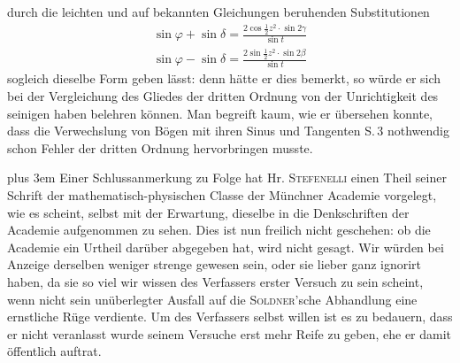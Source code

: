 durch die leichten und auf bekannten Gleichungen beruhenden Substitutionen
\[
\begin{gathered}
\sin\varphi+\sin\delta=\frac{2\cos\frac{1}{2}z^2\cdot\sin2\gamma}{\sin t}\\[5pt]
\sin\varphi-\sin\delta=\frac{2\sin\frac{1}{2}z^2\cdot\sin2\beta}{\sin t}
\end{gathered}
\]
sogleich dieselbe Form geben lässt: denn hätte er dies bemerkt, so würde er sich bei der
Vergleichung des Gliedes der dritten Ordnung von der Unrichtigkeit des seinigen haben belehren
können. Man begreift kaum, wie er übersehen konnte, dass die Verwechslung von Bögen mit ihren
Sinus und Tangenten S.\,3 nothwendig schon Fehler der dritten Ordnung hervorbringen musste.

\begingroup\rightskip=0pt plus 3em
Einer Schlussanmerkung zu Folge hat Hr. \textsc{Stefenelli} einen Theil seiner Schrift der
mathematisch-physischen Classe der Münchner Academie vorgelegt, wie es scheint, selbst mit der
Erwartung, dieselbe in die Denkschriften der Academie aufgenommen zu sehen. Dies ist nun freilich
nicht geschehen: ob die Academie ein Urtheil darüber abgegeben hat, wird nicht gesagt. Wir würden
bei Anzeige derselben weniger strenge gewesen sein, oder sie lieber ganz ignorirt haben, da sie so
viel wir wissen des Verfassers erster Versuch zu sein scheint, wenn nicht sein unüberlegter Ausfall
auf die \textsc{Soldner}'sche Abhandlung eine ernstliche Rüge verdiente. Um des Verfassers selbst
willen ist es zu bedauern, dass er nicht veranlasst wurde seinem Versuche erst mehr Reife zu geben,
ehe er damit öffentlich auftrat.\par\endgroup
